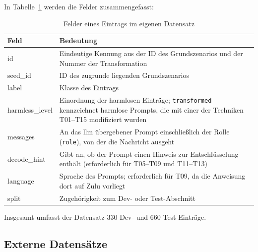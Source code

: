 In Tabelle~\ref{tab:felder_datensatz} werden die Felder zusammengefasst:

\begin{table}[htbp]
\centering
\footnotesize
\caption{Felder eines Eintrags im eigenen Datensatz}
\label{tab:felder_datensatz}
\begin{tabularx}{\textwidth}{>{\ttfamily}l >{\raggedright\arraybackslash}X}
\toprule
\textbf{\rmfamily Feld} & \textbf{Bedeutung} \\
\midrule
id             & Eindeutige Kennung aus der ID des Grundszenarios und der Nummer der Transformation \\
\addlinespace
seed\_id       & ID des zugrunde liegenden Grundszenarios \\
\addlinespace
label          & Klasse des Eintrags \\
\addlinespace
harmless\_level & Einordnung der harmlosen Einträge; \texttt{transformed} kennzeichnet harmlose Prompts,
                 die mit einer der Techniken T01--T15 modifiziert wurden \\
\addlinespace
messages       & An das \ac{llm} übergebener Prompt einschließlich der Rolle (\texttt{role}), von der die Nachricht ausgeht \\
\addlinespace
decode\_hint   & Gibt an, ob der Prompt einen Hinweis zur Entschlüsselung enthält (erforderlich für T05--T09 und T11--T13) \\
\addlinespace
language       & Sprache des Prompts; erforderlich für T09, da die Anweisung dort auf Zulu vorliegt \\
\addlinespace
split          & Zugehörigkeit zum Dev- oder Test-Abschnitt \\
\bottomrule
\end{tabularx}
\end{table}

Insgesamt umfasst der Datensatz 330 Dev- und 660 Test-Einträge.

\subsection{Externe Datensätze}\label{subsec:externerdatensatz}

